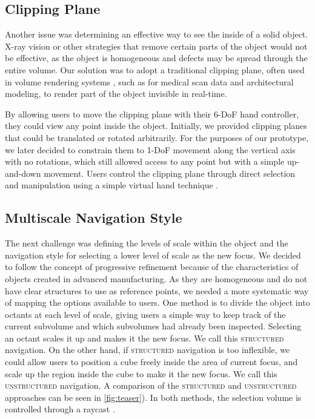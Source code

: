 \subsection{Clipping Plane}
Another issue was determining an effective way to see the inside of a solid object. X-ray vision or other strategies that remove certain parts of the object \cite{bane_interactive_2004, lisle_clean_2022} would not be effective, as the object is homogeneous and defects may be spread through the entire volume. Our solution was to adopt a traditional clipping plane, often used in volume rendering systems \cite{viega_3d_1996, sousa_vrrrroom_2017}, such as for medical scan data and architectural modeling, to render part of the object invisible in real-time.

By allowing users to move the clipping plane with their 6-DoF hand controller, they could view any point inside the object. Initially, we provided clipping planes that could be translated or rotated arbitrarily. For the purposes of our prototype, we later decided to constrain them to 1-DoF movement along the vertical axis with no rotations, which still allowed access to any point but with a simple up-and-down movement. Users control the clipping plane through direct selection and manipulation using a simple virtual hand technique \cite{laviola_3d_2017}.

\subsection{Multiscale Navigation Style}
The next challenge was defining the levels of scale within the object and the navigation style for selecting a lower level of scale as the new focus. We decided to follow the concept of progressive refinement because of the characteristics of objects created in advanced manufacturing. As they are homogeneous and do not have clear structures to use as reference points, we needed a more systematic way of mapping the options available to users. One method is to divide the object into octants at each level of scale, giving users a simple way to keep track of the current subvolume and which subvolumes had already been inspected. Selecting an octant scales it up and makes it the new focus. We call this \textsc{structured} navigation. On the other hand, if \textsc{structured} navigation is too inflexible, we could allow users to position a cube freely inside the area of current focus, and scale up the region inside the cube to make it the new focus. We call this \textsc{unstructured} navigation. A comparison of the \textsc{structured} and \textsc{unstructured} approaches can be seen in \autoref{fig:teaser}). In both methods, the selection volume is controlled through a raycast \cite{laviola_3d_2017}.

